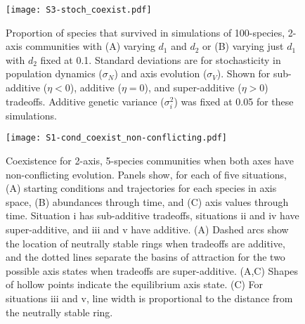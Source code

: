






\begin{figure}[ht!]
\centering
\texttt{[image: S3-stoch\_coexist.pdf]}
\caption{Proportion of species that survived in simulations of 100-species, 2-axis
    communities with
    (A) varying $d_1$ and $d_2$ or 
    (B) varying just $d_1$ with $d_2$ fixed at 0.1.
    Standard deviations are for stochasticity in
    population dynamics ($\sigma_N$) and
    axis evolution ($\sigma_V$).
    Shown for sub-additive ($\eta < 0$), additive ($\eta = 0$), and 
    super-additive ($\eta > 0$) tradeoffs.
    Additive genetic variance ($\sigma_i^2$) was fixed at 0.05 for 
    these simulations.}
\label{fig:stoch-coexist-nspp}
\end{figure}



\begin{figure}[ht!]
\centering
\texttt{[image: S1-cond\_coexist\_non-conflicting.pdf]}
\caption{Coexistence for 2-axis, 5-species communities when
    both axes have non-conflicting evolution.
    Panels show, for each of five situations,
    (A) starting conditions and trajectories for each species in axis space, 
    (B) abundances through time, and 
    (C) axis values through time.
    Situation i has sub-additive tradeoffs, situations ii and iv have 
    super-additive, and iii and v have additive.
    (A) Dashed arcs show the location of neutrally stable rings
    when tradeoffs are additive, and 
    the dotted lines separate the basins of attraction for the two possible
    axis states when tradeoffs are super-additive.
    (A,C) Shapes of hollow points indicate the equilibrium axis state.
    (C) For situations iii and v, line width is proportional to the 
    distance from the neutrally stable ring.}
\label{fig:cond-coexist-non-conflicting}
\end{figure}


